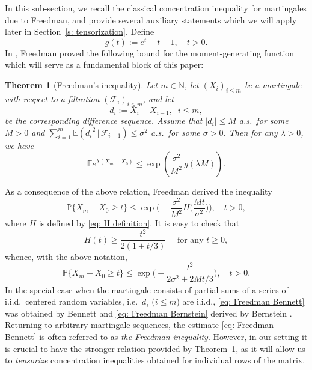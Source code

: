 \documentclass[12pt]{article}
\newtheorem{theorem}{Theorem}[section]
\theoremstyle{definition}
\theoremstyle{plain}
\newcommand{\N}{\mathbb{N}}
\newcommand{\E}{\mathbb{E}}
\def\Prob{{\mathbb P}}
\def\gfunction{{g}}
\begin{document}
In this sub-section, we recall the classical concentration inequality for martingales
due to Freedman, and provide several auxiliary statements which we will apply later
in Section~\ref{s: tensorization}.
Define
\begin{equation}\label{eq: e definition}
\gfunction(t):=e^t-t-1,\quad t>0.
\end{equation}
In \cite{Freedman}, Freedman proved the following bound for the moment-generating function
which will serve as a fundamental block of this paper:
\begin{theorem}[Freedman's inequality]\label{th-freedman-moment}
Let $m\in\N$, let $(X_i)_{i\leq m}$ be a martingale with respect to a filtration $(\mathcal{F}_i)_{i\leq m}$, and 
let
$$d_i:=X_i-X_{i-1},\;\;i\leq m,$$
be the corresponding difference sequence. Assume that $|d_i|\leq M$ a.s.\ for some $M>0$ and 
$\sum_{i=1}^m\E({d_i}^2\,|\,\mathcal F_{i-1})\leq \sigma^2$ a.s.\ for some $\sigma>0$. Then for any $\lambda>0$, we have 
$$
\E e^{\lambda (X_m-X_0)}\leq \exp\left(\frac{\sigma^2}{M^2}\,\gfunction(\lambda M)\right).
$$
\end{theorem}
As a consequence of the above relation, Freedman derived the inequality
\begin{equation}\label{eq: Freedman Bennett}
\Prob\big\{X_m-X_0\geq t\big\}
\leq \exp\bigg(-\frac{\sigma^2}{M^2}H\Big(\frac{Mt}{\sigma^2}\Big)\bigg),\quad t>0,
\end{equation}
where $H$ is defined by \eqref{eq: H definition}.
It is easy to check that
\begin{equation}\label{eq-min-h}
H(t)\geq \frac{t^2}{2(1+t/3)}\quad\mbox{ for any }t\geq 0,
\end{equation}
whence, with the above notation,
\begin{equation}\label{eq: Freedman Bernstein}
\Prob\big\{X_m-X_0\geq t\big\}
\leq \exp\bigg(-\frac{t^2}{2\sigma^2+2Mt/3}\bigg),\quad t>0.
\end{equation}
In the special case when
the martingale consists of partial sums of a series of i.i.d.\ centered random variables,
i.e.\ $d_i$ ($i\leq m$) are i.i.d., \eqref{eq: Freedman Bennett}
was obtained by Bennett \cite{Bennett} and \eqref{eq: Freedman Bernstein} derived by Bernstein \cite{Bernstein}.
Returning to arbitrary martingale sequences, the estimate \eqref{eq: Freedman Bennett}
is often referred to as {\it the Freedman inequality}. However, in our setting it is crucial to have the stronger
relation provided by Theorem~\ref{th-freedman-moment},
as it will allow us to {\it tensorize} concentration inequalities obtained for individual rows of the matrix.
\end{document}
